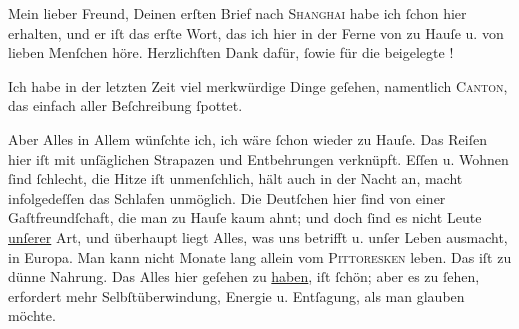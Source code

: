 \pstart\center{}Mein lieber Freund,\pend\vspace{0.5em}
\pstart
           Deinen erſten Brief nach \textsc{Shanghai} habe ich{ }ſchon hier
               erhalten, und er iſt das erſte Wort, das ich hier in der Ferne von zu Hauſe u. von
               lieben Menſchen höre. Herzlichſten Dank dafür,{ }ſowie für die beigelegte \label{K_L02845-1v}\label{K_L02845-1}!\pend
           
\pstart
           Ich habe in der letzten {\pb}Zeit viel merkwürdige Dinge
               geſehen, namentlich \textsc{Canton}, das einfach aller Beſchreibung{ }ſpottet.\pend
           
\pstart
           Aber Alles in Allem wünſchte ich, ich wäre{ }ſchon wieder zu Hauſe. Das Reiſen hier iſt
               mit unſäglichen Strapazen und Entbehrungen verknüpft. Eſſen u. Wohnen{ }ſind{ }ſchlecht,
               die Hitze iſt \strikeout{\textcolor{gray}{e}\textcolor{gray}{×}} unmenſchlich, hält auch in der Nacht an, macht infolgedeſſen das Schlafen
               unmöglich. Die Deutſchen hier{ }ſind von einer {\pb}Gaſtfreundſchaft, die man zu Hauſe
               kaum ahnt; und doch{ }ſind es nicht Leute \uline{unſerer} Art,
               und überhaupt liegt Alles, was uns betrifft u. unſer Leben ausmacht, in Europa.  Man
               kann nicht Monate lang allein vom \textsc{Pittoresken} leben. Das
               iſt zu dünne Nahrung. Das Alles hier geſehen zu \uline{haben}, iſt{ }ſchön;  aber es zu{ }ſehen, erfordert mehr Selbſtüberwindung, Energie u. Entſagung, als man
               glauben möchte.\pend
           
